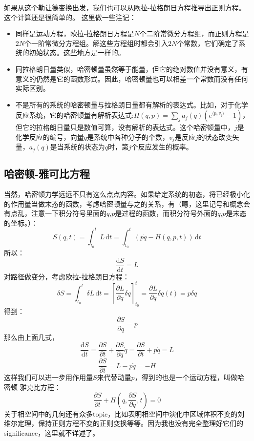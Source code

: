 \documentclass{ctexart}
\begin{document}
如果从这个勒让德变换出发，我们也可以从欧拉-拉格朗日方程推导出正则方程。这个计算还是很简单的。
这里做一些注记：
\begin{itemize}
\item 同样是运动方程，欧拉-拉格朗日方程是$N$个二阶常微分方程组，而正则方程是$2N$个一阶常微分方程组。解这些方程组时都会引入$2N$个常数，它们确定了系统的初始状态。这些地方是一样的。

\item 同拉格朗日量类似，哈密顿量虽然等于能量，但它的绝对数值并没有意义，有意义的仍然是它的函数形式。因此，哈密顿量也可以相差一个常数而没有任何实际区别。

\item 不是所有的系统的哈密顿量与拉格朗日量都有解析的表达式。比如，对于化学反应系统，它的哈密顿量有解析表达式:$H(q,p)=\sum_ja_j(q)(e^{\langle p,v_j\rangle}-1)$，但它的拉格朗日量只是数值可算，没有解析的表达式。这个哈密顿量中，$j$是化学反应的编号，向量$q$是系统中各种分子的个数，$v_j$是反应$j$的状态改变矢量，$a_j(q)$是当系统的状态为$q$时，第$j$个反应发生的概率。
\end{itemize}

\subsection{哈密顿-雅可比方程}
当然，哈密顿力学远远不只有这么点点内容。如果给定系统的初态，将已经极小化的作用量当做末态的函数，考虑哈密顿量与之的关系，有（嗯，这里记号和概念会有点乱，注意一下积分符号里面的$q$,$p$是过程的函数，而积分符号外面的$q$,$p$是末态的坐标。）：
\begin{equation}
S(q,t)=\int_{t_0}^t L\,\mathrm{d}t=\int_{t_0}^t(p\dot{q}-H(q,p,t))\,\mathrm{d}t
\end{equation}
所以：
\begin{equation}
\frac{\mathrm{d}S}{\mathrm{d}t}=L
\end{equation}
对路径做变分，考虑欧拉-拉格朗日方程：
\begin{equation}
\delta S=\int_{t_0}^t\delta L\,\mathrm{d}t=\left[\frac{\partial L}{\partial q}\delta q\right]_{t_0}^{t}=\frac{\partial L}{\partial q}\delta q(t)=p\delta q
\end{equation}
得到：
\begin{equation}
\frac{\partial S}{\partial q}=p
\end{equation}
那么由上面几式，
\begin{equation}
\frac{\mathrm{d}S}{\mathrm{d}t}=\frac{\partial S}{\partial t}+\frac{\partial S}{\partial q}\dot{q}=\frac{\partial S}{\partial t}+p\dot{q}=L
\end{equation}
\begin{equation}
\frac{\partial S}{\partial t}=L-p\dot{q}=-H
\end{equation}
这样我们可以进一步用作用量$S$来代替动量$p$，得到的也是一个运动方程，叫做哈密顿-雅克比方程：
\begin{equation}
\frac{\partial S}{\partial t}+H(q,\frac{\partial S}{\partial q},t)=0
\end{equation}
关于相空间中的几何还有众多topic，比如表明相空间中演化中区域体积不变的刘维尔定理，保持正则方程不变的正则变换等等。因为我也没有完全整理好它们的significance，这里就不详述了。
\end{document}
